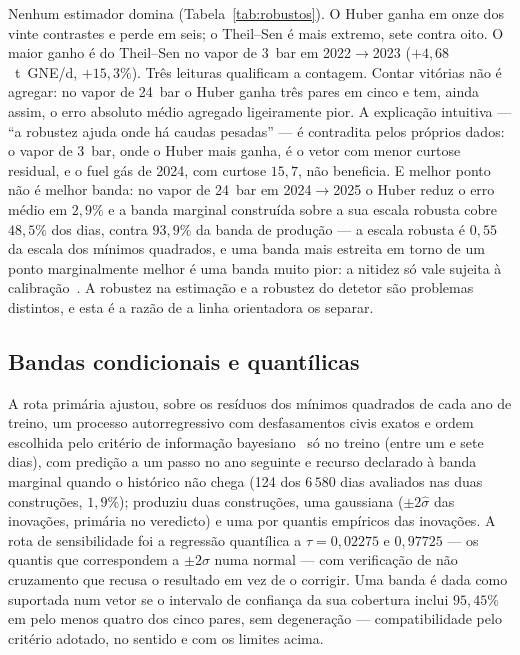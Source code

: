 Nenhum estimador domina (Tabela~\ref{tab:robustos}). O Huber ganha em onze
dos vinte contrastes e perde em seis; o Theil--Sen é mais extremo, sete
contra oito. O maior ganho é do Theil--Sen no vapor de 3~bar em
2022${\to}$2023 ($+4{,}68$~t~GNE/d, $+15{,}3\%$). Três leituras
qualificam a contagem. Contar vitórias não é agregar: no vapor de 24~bar o
Huber ganha três pares em cinco e tem, ainda assim, o erro absoluto médio
agregado ligeiramente pior. A explicação intuitiva --- ``a robustez ajuda
onde há caudas pesadas'' --- é contradita pelos próprios dados: o vapor de
3~bar, onde o Huber mais ganha, é o vetor com menor curtose residual, e o
fuel gás de 2024, com curtose $15{,}7$, não beneficia. E melhor ponto não é
melhor banda: no vapor de 24~bar em 2024${\to}$2025 o Huber reduz o erro
médio em $2{,}9\%$ e a banda marginal construída sobre a sua escala robusta
cobre $48{,}5\%$ dos dias, contra $93{,}9\%$ da banda de produção --- a
escala robusta é $0{,}55$ da escala dos mínimos quadrados, e uma banda mais
estreita em torno de um ponto marginalmente melhor é uma banda muito pior:
a nitidez só vale sujeita à calibração~\cite{Gneiting2007}.
A robustez na estimação e a robustez do detetor são problemas distintos, e
esta é a razão de a linha orientadora os separar.

\subsection{Bandas condicionais e quantílicas}
\label{sec:demo-bandas}

A rota primária ajustou, sobre os resíduos dos mínimos quadrados de cada ano
de treino, um processo autorregressivo com desfasamentos civis exatos e
ordem escolhida pelo critério de informação bayesiano~\cite{Schwarz1978} só
no treino (entre um e sete dias), com predição a um passo no ano seguinte e recurso declarado à banda
marginal quando o histórico não chega (124 dos $6\,580$ dias avaliados nas
duas construções, $1{,}9\%$); produziu duas construções, uma
gaussiana ($\pm 2\hat\sigma$ das inovações, primária no veredicto) e uma por
quantis empíricos das inovações. A rota de sensibilidade foi a regressão
quantílica a $\tau = 0{,}02275$ e $0{,}97725$ --- os quantis que
correspondem a $\pm 2\sigma$ numa normal --- com verificação de não
cruzamento que recusa o resultado em vez de o corrigir. Uma banda é
dada como suportada num vetor se o intervalo de confiança da sua cobertura
inclui $95{,}45\%$ em pelo menos quatro dos cinco pares, sem degeneração ---
compatibilidade pelo critério adotado, no sentido e com os limites acima.

